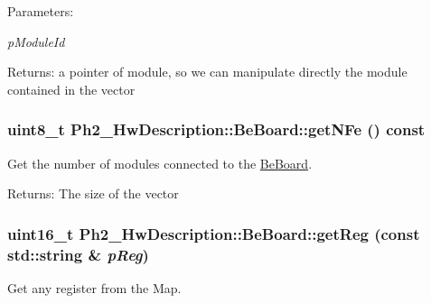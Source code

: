 \begin{Desc}
\item[Parameters:]
\begin{description}
\item[{\em p\-Module\-Id}]\end{description}
\end{Desc}
\begin{Desc}
\item[Returns:]a pointer of module, so we can manipulate directly the module contained in the vector \end{Desc}
\hypertarget{class_ph2___hw_description_1_1_be_board_34239d72c4929ae85cd9eb27a6bf9b2d}{
\subsubsection[getNFe]{\setlength{\rightskip}{0pt plus 5cm}uint8\_\-t Ph2\_\-Hw\-Description::Be\-Board::get\-NFe () const}}
\label{class_ph2___hw_description_1_1_be_board_34239d72c4929ae85cd9eb27a6bf9b2d}


Get the number of modules connected to the \hyperlink{class_ph2___hw_description_1_1_be_board}{Be\-Board}. 

\begin{Desc}
\item[Returns:]The size of the vector \end{Desc}
\hypertarget{class_ph2___hw_description_1_1_be_board_e28c81e80dab7acdd5fa90819709f339}{
\subsubsection[getReg]{\setlength{\rightskip}{0pt plus 5cm}uint16\_\-t Ph2\_\-Hw\-Description::Be\-Board::get\-Reg (const std::string \& {\em p\-Reg})}}
\label{class_ph2___hw_description_1_1_be_board_e28c81e80dab7acdd5fa90819709f339}


Get any register from the Map. 

